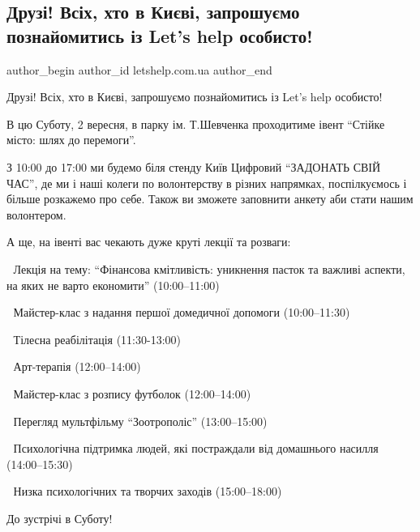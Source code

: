 
 
 
 
 

\subsection{Друзі! Всіх, хто в Києві, запрошуємо познайомитись із Let's help особисто!}
\label{sec:01_09_2023.fb.letshelp.com.ua.1.druzi_kyiv_zaproshujemo_poznajomytys_osobysto}

\ifcmt
 author_begin
   author_id letshelp.com.ua
 author_end
\fi

Друзі! Всіх, хто в Києві, запрошуємо познайомитись із Let's help особисто!

В цю Суботу, 2 вересня, в парку ім. Т.Шевченка проходитиме івент
\enquote{Стійке місто: шлях до перемоги}.

З 10:00 до 17:00 ми будемо біля стенду Київ Цифровий \enquote{ЗАДОНАТЬ СВІЙ
ЧАС}, де ми і наші колеги по волонтерству в різних напрямках, поспілкуємось і
більше розкажемо про себе. Також ви зможете заповнити анкету аби стати нашим
волонтером.

А ще, на івенті вас чекають дуже круті лекції та розваги:

🔸 Лекція на тему: \enquote{Фінансова кмітливість: уникнення пасток та важливі аспекти, на яких не варто економити} (10:00–11:00)\par
🔸 Майстер-клас з надання першої домедичної допомоги (10:00–11:30)\par
🔸 Тілесна реабілітація (11:30-13:00)\par
🔸 Арт-терапія (12:00–14:00)\par
🔸 Майстер-клас з розпису футболок (12:00–14:00)\par
🔸 Перегляд мультфільму \enquote{Зоотрополіс} (13:00–15:00)\par
🔸 Психологічна підтримка людей, які постраждали від домашнього насилля (14:00–15:30)\par
🔸 Низка психологічних та творчих заходів (15:00–18:00)\par

До зустрічі в Суботу!
